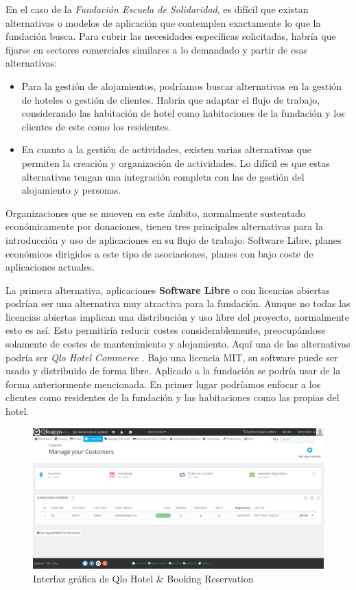 En el caso de la \textit{Fundación Escuela de Solidaridad}, es difícil que existan alternativas o modelos de aplicación que contemplen exactamente lo que la fundación busca. Para cubrir las necesidades específicas solicitadas, habría que fijarse en sectores comerciales similares a lo demandado y partir de esas alternativas:

\begin{itemize}
    \item Para la gestión de alojamientos, podríamos buscar alternativas en la gestión de hoteles o gestión de clientes. Habría que adaptar el flujo de trabajo, considerando las habitación de hotel como habitaciones de la fundación y los clientes de este como los residentes.
    \item En cuanto a la gestión de actividades, existen varias alternativas que permiten la creación y organización de actividades. Lo difícil es que estas alternativas tengan una integración completa con las de gestión del alojamiento y personas.
\end{itemize}

Organizaciones que se mueven en este ámbito, normalmente sustentado económicamente por donaciones, tienen tres principales alternativas para la introducción y uso de aplicaciones en su flujo de trabajo: Software Libre, planes económicos dirigidos a este tipo de asociaciones, planes con bajo coste de aplicaciones actuales. 

La primera alternativa, aplicaciones \textbf{Software Libre} o con licencias abiertas podrían ser una alternativa muy atractiva para la fundación. Aunque no todas las licencias abiertas implican una distribución y uso libre del proyecto, normalmente esto es así. Esto permitiría reducir costes considerablemente, preocupándose solamente de costes de mantenimiento y alojamiento. Aquí una de las alternativas podría ser \textit{Qlo Hotel Commerce} \cite{qloapps}. Bajo una licencia MIT, su software puede ser usado y distribuido de forma libre. Aplicado a la fundación se podría usar de la forma anteriormente mencionada. En primer lugar podríamos enfocar a los clientes como residentes de la fundación y las habitaciones como las propias del hotel. 

\begin{figure}[h!]
    \centerline{\includegraphics[width=\textwidth]{imagenes/estado_arte/qlo.png}}
    \caption{Interfaz gráfica de Qlo Hotel \& Booking Reservation}
    \label{fig}
\end{figure}


